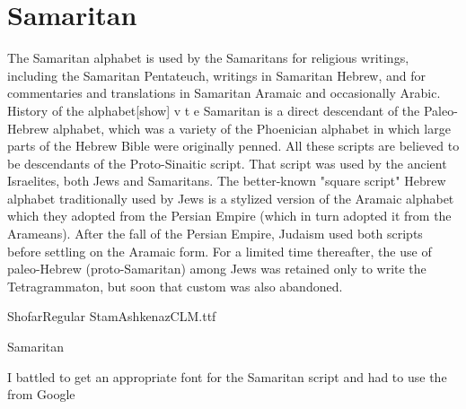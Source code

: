 \section{Samaritan}

The Samaritan alphabet is used by the Samaritans for religious writings, including the Samaritan Pentateuch, writings in Samaritan Hebrew, and for commentaries and translations in Samaritan Aramaic and occasionally Arabic.
History of the alphabet[show]
v t e
Samaritan is a direct descendant of the Paleo-Hebrew alphabet, which was a variety of the Phoenician alphabet in which large parts of the Hebrew Bible were originally penned. All these scripts are believed to be descendants of the Proto-Sinaitic script. That script was used by the ancient Israelites, both Jews and Samaritans. The better-known "square script" Hebrew alphabet traditionally used by Jews is a stylized version of the Aramaic alphabet which they adopted from the Persian Empire (which in turn adopted it from the Arameans). After the fall of the Persian Empire, Judaism used both scripts before settling on the Aramaic form. For a limited time thereafter, the use of paleo-Hebrew (proto-Samaritan) among Jews was retained only to write the Tetragrammaton, but soon that custom was also abandoned.

\newfontfamily{}
ShofarRegular StamAshkenazCLM.ttf

\begin{scriptexample}[]{Samaritan}
\bgroup
{}
\egroup
\end{scriptexample}

I battled to get an appropriate font for the Samaritan script and had to use the  from Google